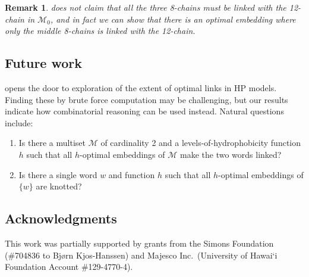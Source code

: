 \documentclass{article}
\newtheorem{remark}[theorem]{Remark}
\begin{document}
\begin{remark}%
	 does not claim that all the three 8-chains must be linked with the 12-chain in $\mathscr M_0$,
	and in fact we can show that there is an optimal embedding where only the middle 8-chains is linked with the 12-chain.
\end{remark}

\subsection*{Future work}
 opens the door to exploration of the extent of optimal links in HP models.
Finding these by brute force computation may be challenging, but our results indicate how combinatorial reasoning can be used instead.
Natural questions include:
\begin{enumerate}
	\item Is there a multiset $\mathscr M$ of cardinality 2 and a levels-of-hydrophobicity function $h$ such that
		all $h$-optimal embeddings of $\mathscr M$ make the two words linked?
	\item Is there a single word $w$ and function $h$ such that all $h$-optimal embeddings of $\{w\}$ are knotted?
\end{enumerate}


\subsection*{Acknowledgments}
This work was partially supported by grants from the Simons Foundation (\#704836
to Bj{\o}rn Kjos-Hanssen) and Majesco Inc.~(University of Hawai\textquoteleft i Foundation
Account \#129-4770-4).



\end{document}
